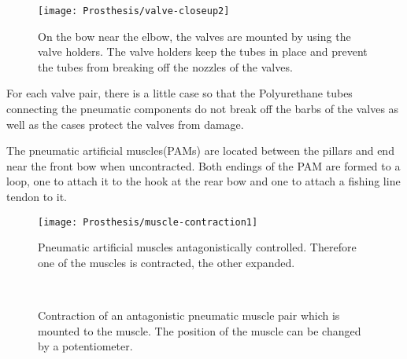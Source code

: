\documentclass[main]{subfiles}
\begin{document}
\begin{figure}[H]
\centering
\texttt{[image: Prosthesis/valve-closeup2]}
\caption[Smaller bow]{On the bow near the elbow, the valves are mounted by using the valve holders. The valve holders keep the tubes in place and prevent the tubes from breaking off the nozzles of the valves.}
\label{pillars}
\end{figure}
   
For each valve pair, there is a little case so that the Polyurethane tubes connecting the pneumatic components do not break off the barbs of the valves as well as the cases protect the valves from damage.

The pneumatic artificial muscles(PAMs) are located between the pillars and end near the front bow when uncontracted. Both endings of the PAM are formed to a loop, one to attach it to the hook at the rear bow and one to attach a fishing line tendon to it.


\begin{figure}[H]
\centering
\texttt{[image: Prosthesis/muscle-contraction1]}
\caption[Antagonistic pneumatic artificial muscles]{Pneumatic artificial muscles antagonistically controlled. Therefore one of the muscles is contracted, the other expanded.}
\label{pneumatic muscles}
\end{figure}

\begin{figure}[H]
\centering
{}
\\
\caption[Contraction of an antagonistic pneumatic muscle pair]{Contraction of an antagonistic pneumatic muscle pair which is mounted to the muscle. The position of the muscle can be changed by a potentiometer.}
\end{figure}
\end{document}
